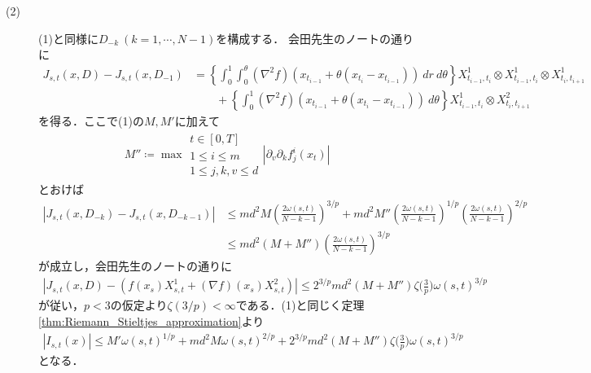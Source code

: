 \begin{prf}
\begin{description}
			\item[(2)]
				(1)と同様に$D_{-k}\ (k=1,\cdots,N-1)$を構成する．
				会田先生のノートの通りに
				\begin{align}
					J_{s,t}(x,D) - J_{s,t}(x,D_{-1})
					&= \left\{ \int_0^1 \int_0^\theta (\nabla^2 f)(x_{t_{i-1}} + \theta (x_{t_i}- x_{t_{i-1}}))\ dr\ d\theta \right\}
						X^1_{t_{i-1},t_i} \otimes X^1_{t_{i-1},t_i} \otimes X^1_{t_i,t_{i+1}} \\
						&\qquad + \left\{ \int_0^1 (\nabla^2 f)(x_{t_{i-1}} + \theta (x_{t_i}- x_{t_{i-1}}))\ d\theta \right\}
						X^1_{t_{i-1},t_i} \otimes X^2_{t_i,t_{i+1}}
				\end{align}
				を得る．ここで(1)の$M,M'$に加えて
				\begin{align}
					M'' \coloneqq \max{
					\substack{t \in [0,T] \\ 1 \leq i \leq m \\ 1 \leq j,k,v \leq d}}
					{\left| \partial_v \partial_k f^i_j(x_t) \right|}
				\end{align}
				とおけば
				\begin{align}
					\left| J_{s,t}(x,D_{-k}) - J_{s,t}(x,D_{-k-1}) \right|
					&\leq m d^2 M \left( \frac{2\omega(s,t)}{N-k-1} \right)^{3/p} + m d^2 M'' \left( \frac{2\omega(s,t)}{N-k-1} \right)^{1/p} \left( \frac{2\omega(s,t)}{N-k-1} \right)^{2/p} \\
					&\leq m d^2 (M + M'') \left( \frac{2\omega(s,t)}{N-k-1} \right)^{3/p}
				\end{align}
				が成立し，会田先生のノートの通りに
				\begin{align}
					\left| J_{s,t}(x,D) - \left( f(x_s)X^1_{s,t} + (\nabla f)(x_s)X^2_{s,t} \right) \right|
					\leq 2^{3/p} m d^2 (M+M'') \zeta\biggl(\frac{3}{p}\biggr) \omega(s,t)^{3/p}
				\end{align}
				が従い，$p < 3$の仮定より$\zeta(3/p) < \infty$である．(1)と同じく定理\ref{thm:Riemann_Stieltjes_approximation}より
				\begin{align}
					\left| I_{s,t}(x) \right|
					\leq M' \omega(s,t)^{1/p} + m d^2 M \omega(s,t)^{2/p} + 2^{3/p} m d^2 (M+M'') \zeta\biggl(\frac{3}{p}\biggr) \omega(s,t)^{3/p}
				\end{align}
				となる．
				\QED
		\end{description}
	\end{prf}
	
